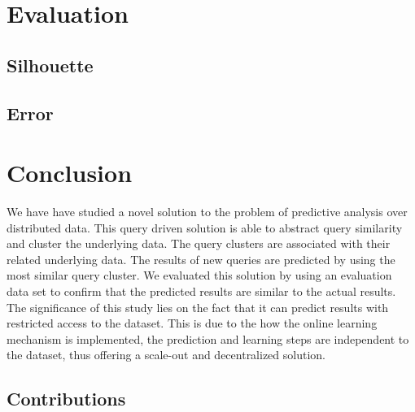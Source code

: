 \documentclass{lmproj}
\begin{document}
\chapter{Evaluation}
\section{Silhouette}
\section{Error}
\chapter{Conclusion}
We have have studied a novel solution to the problem of predictive analysis over distributed data. This query driven solution is able to abstract query similarity and cluster the underlying data. The query clusters are associated with their related underlying data. The results of new queries are predicted by using the most similar query cluster. We evaluated this solution by using an evaluation data set to confirm that the predicted results are similar to the actual results. The significance of this study lies on the fact that it can predict results with restricted access to the dataset. This is due to the how the online learning mechanism is implemented, the prediction and learning steps are independent to the dataset, thus offering a scale-out and decentralized solution. 

\section{Contributions}




\end{document}
